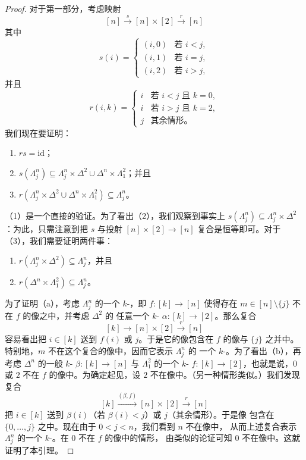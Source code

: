 \begin{proof}
对于第一部分，考虑映射
\[
[n] \xrightarrow{\ s\ } [n] \times [2] \xrightarrow{\ r\ } [n]
\]
其中
\[
s(i) =
\begin{cases}
(i, 0) & \text{若 } i < j,\\
(i, 1) & \text{若 } i = j,\\
(i, 2) & \text{若 } i > j,
\end{cases}
\]
并且
\[
r(i, k) =
\begin{cases}
i & \text{若 } i < j \text{ 且 } k = 0,\\
i & \text{若 } i > j \text{ 且 } k = 2,\\
j & \text{其余情形。}
\end{cases}
\]
我们现在要证明：
\begin{enumerate}[label=(\arabic*)]
  \item $rs = \mathrm{id}$；
  \item $s(\Lambda^n_j) \subseteq \Lambda^n_j \times \Delta^2 \cup \Delta^n \times \Lambda^2_1$；并且
  \item $r(\Lambda^n_j \times \Delta^2 \cup \Delta^n \times \Lambda^2_1) \subseteq \Lambda^n_j$。
\end{enumerate}
（1）是一个直接的验证。为了看出（2），我们观察到事实上
$s(\Lambda^n_j) \subseteq \Lambda^n_j \times \Delta^2$：为此，只需注意到把 $s$
与投射 $[n] \times [2] \to [n]$ 复合是恒等即可。对于（3），我们需要证明两件事：
\begin{enumerate}[label=(\alph*)]
  \item $r(\Lambda^n_j \times \Delta^2) \subseteq \Lambda^n_j$，并且
  \item $r(\Delta^n \times \Lambda^2_1) \subseteq \Lambda^n_j$。
\end{enumerate}
为了证明（a），考虑 $\Lambda^n_j$ 的一个 $k$-\trSimplex{}，即 $f\colon [k] \to [n]$
使得存在 $m \in [n] \setminus \{j\}$ 不在 $f$ 的像之中，并考虑 $\Delta^2$ 的
任意一个 $k$-\trSimplex{} $\alpha\colon [k] \to [2]$。那么复合
\[
[k] \to [n] \times [2] \xrightarrow{\ r\ } [n]
\]
容易看出把 $i \in [k]$ 送到 $f(i)$ 或 $j$。于是它的像包含在 $f$ 的像与
$\{j\}$ 之并中。特别地，$m$ 不在这个复合的像中，因而它表示 $\Lambda^n_j$ 的
一个 $k$-\trSimplex{}。为了看出（b），再考虑 $\Delta^n$ 的一般 $k$-\trSimplex{}%
$\beta\colon [k] \to [n]$ 与 $\Lambda^2_1$ 的一个 $k$-\trSimplex{}%
$f\colon [k] \to [2]$，也就是说，$0$ 或 $2$ 不在 $f$ 的像中。为确定起见，设
$2$ 不在像中。（另一种情形类似。）我们发现复合
\[
[k] \xrightarrow{(\beta, f)} [n] \times [2] \xrightarrow{\ r\ } [n]
\]
把 $i \in [k]$ 送到 $\beta(i)$（若 $\beta(i) < j$）或 $j$（其余情形）。于是像
包含在 $\{0, \dotsc, j\}$ 之中。现在由于 $0 < j < n$，我们看到 $n$ 不在像中，
从而上述复合表示 $\Lambda^n_j$ 的一个 $k$-\trSimplex{}。在 $0$ 不在 $f$ 的像中的情形，
由类似的论证可知 $0$ 不在像中。这就证明了本引理。
\end{proof}

